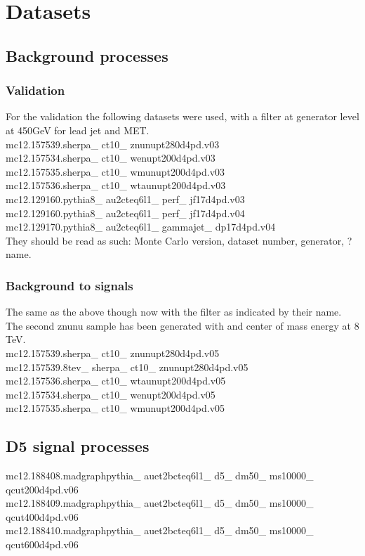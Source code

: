 \chapter{Datasets}\label{cha:datasets}
\section{Background processes}
\subsection{Validation}
For the validation the following datasets were used, with a filter at generator level at 450GeV for lead jet and MET. \\
mc12.157539.sherpa\_  ct10\_  znunupt280d4pd.v03\\
mc12.157534.sherpa\_  ct10\_  wenupt200d4pd.v03\\
mc12.157535.sherpa\_  ct10\_  wmunupt200d4pd.v03\\
mc12.157536.sherpa\_  ct10\_  wtaunupt200d4pd.v03\\
mc12.129160.pythia8\_  au2cteq6l1\_  perf\_  jf17d4pd.v03\\
mc12.129160.pythia8\_  au2cteq6l1\_  perf\_  jf17d4pd.v04\\
mc12.129170.pythia8\_  au2cteq6l1\_  gammajet\_  dp17d4pd.v04\\

They should be read as such: Monte Carlo version, dataset number, generator, ? name.

\subsection{Background to signals}
The same as the above though now with the filter as indicated by their name. The second znunu sample has been generated with and center of mass energy at 8 TeV. \\
mc12.157539.sherpa\_  ct10\_  znunupt280d4pd.v05\\
mc12.157539.8tev\_  sherpa\_  ct10\_  znunupt280d4pd.v05\\
mc12.157536.sherpa\_  ct10\_  wtaunupt200d4pd.v05\\
mc12.157534.sherpa\_  ct10\_  wenupt200d4pd.v05\\
mc12.157535.sherpa\_  ct10\_  wmunupt200d4pd.v05\\
\section{D5 signal processes}
mc12.188408.madgraphpythia\_  auet2bcteq6l1\_  d5\_  dm50\_  ms10000\_  qcut200d4pd.v06\\
mc12.188409.madgraphpythia\_  auet2bcteq6l1\_  d5\_  dm50\_  ms10000\_  qcut400d4pd.v06\\
mc12.188410.madgraphpythia\_  auet2bcteq6l1\_  d5\_  dm50\_  ms10000\_  qcut600d4pd.v06\\

